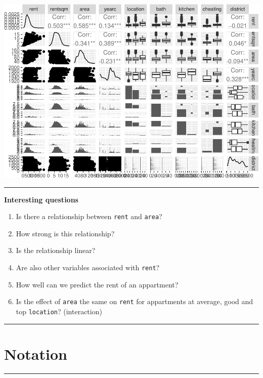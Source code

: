 \documentclass[
]{article}
\providecommand{\tightlist}{%
  \setlength{\itemsep}{0pt}\setlength{\parskip}{0pt}}
\begin{document}
\includegraphics{2MLR_files/figure-latex/unnamed-chunk-1-1.pdf}
\normalsize

\begin{center}\rule{0.5\linewidth}{0.5pt}\end{center}

\textbf{Interesting questions}

\begin{enumerate}
\def\labelenumi{\arabic{enumi}.}
\tightlist
\item
  Is there a relationship between \texttt{rent} and \texttt{area}?
\item
  How strong is this relationship?
\item
  Is the relationship linear?
\item
  Are also other variables associated with \texttt{rent}?
\item
  How well can we predict the rent of an appartment?
\item
  Is the effect of \texttt{area} the same on \texttt{rent} for
  appartments at average, good and top \texttt{location}? (interaction)
\end{enumerate}

\begin{center}\rule{0.5\linewidth}{0.5pt}\end{center}

\hypertarget{notation}{%
\section{Notation}\label{notation}}

\begin{center}\rule{0.5\linewidth}{0.5pt}\end{center}
\end{document}
